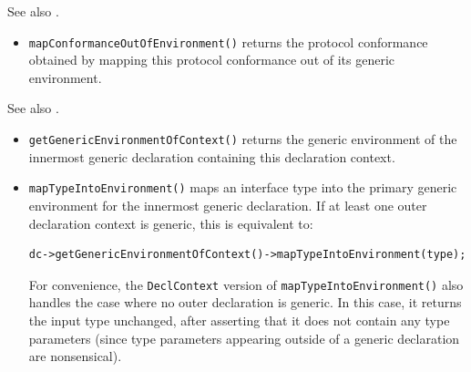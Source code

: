 \documentclass[../generics]{subfiles}
\begin{document}
See also .
\begin{itemize}
\item \texttt{mapConformanceOutOfEnvironment()} returns the protocol conformance obtained by mapping this protocol conformance out of its generic environment.
\end{itemize}

See also .
\begin{itemize}
\item \texttt{getGenericEnvironmentOfContext()} returns the generic environment of the innermost generic declaration containing this declaration context.
\item \texttt{mapTypeIntoEnvironment()} maps an interface type into the primary generic environment for the innermost generic declaration. If at least one outer declaration context is generic, this is equivalent to:
\begin{Verbatim}
dc->getGenericEnvironmentOfContext()->mapTypeIntoEnvironment(type);
\end{Verbatim}
For convenience, the \texttt{DeclContext} version of \texttt{mapTypeIntoEnvironment()} also handles the case where no outer declaration is generic. In this case, it returns the input type unchanged, after asserting that it does not contain any type parameters (since type parameters appearing outside of a generic declaration are nonsensical).
\end{itemize}
\end{document}
